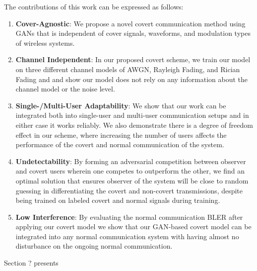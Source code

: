 The contributions of this work can be expressed as follows:
\begin{enumerate}
	\item \textbf{Cover-Agnostic}: We propose a novel covert communication method using GANs that is independent of cover signals, waveforms, and modulation types of wireless systems.
	\item \textbf{Channel Independent}: In our proposed covert scheme, we train our model on three different channel models of AWGN, Rayleigh Fading, and Rician Fading and and show our model does not rely on any information about the channel model or the noise level.
	\item \textbf{Single-/Multi-User Adaptability}: We show that our work can be integrated both into single-user and multi-user communication setups and in either case it works reliably. We also demonstrate there is a degree of freedom effect in our scheme, where increasing the number of users affects the performance of the covert and normal communication of the system.
	\item \textbf{Undetectability}: By forming an adversarial competition between observer and covert users wherein one competes to outperform the other, we find an optimal solution that ensures observer of the system will be close to random guessing in differentiating the covert and non-covert transmissions, despite being trained on labeled covert and normal signals during training.
	\item \textbf{Low Interference}: By evaluating the normal communication BLER after applying our covert model we show that our GAN-based covert model can be integrated into any normal communication system with having almost no disturbance on the ongoing normal communication.
\end{enumerate}

Section ? presents
